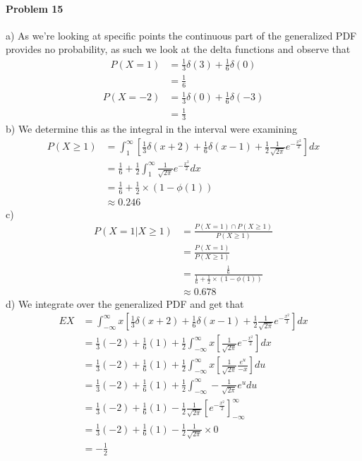 \paragraph{Problem 15}
a)
As we're looking at specific points the continuous part of the generalized PDF provides no probability, as such we look at the delta functions and observe that
\begin{align*}
    P(X=1)&=\frac{1}{3}\delta(3)+\frac{1}{6}\delta(0) \\
          &=\frac{1}{6}
\end{align*}
\begin{align*}
    P(X=-2)&=\frac{1}{3}\delta(0)+\frac{1}{6}\delta(-3) \\
           &=\frac{1}{3}
\end{align*}
b)
We determine this as the integral in the interval were examining
\begin{align*}
    P(X\geq 1)&=\int_{1}^{\infty}\left[\frac{1}{3}\delta(x+2)+\frac{1}{6}\delta(x-1)+\frac{1}{2}\frac{1}{\sqrt{2\pi}}e^{-\frac{x^{2}}{2}}\right]dx \\
              &=\frac{1}{6}+\frac{1}{2}\int_{1}^{\infty}\frac{1}{\sqrt{2\pi}}e^{-\frac{x^{2}}{2}}dx \\
              &=\frac{1}{6}+\frac{1}{2}\times\left(1-\phi(1)\right) \\
              &\approx 0.246
\end{align*}
c)
\begin{align*}
    P(X=1|X\geq 1)&=\frac{P(X=1)\cap P(X\geq 1)}{P(X\geq 1)} \\
               &=\frac{P(X=1)}{P(X\geq 1)} \\
               &=\frac{\frac{1}{6}}{\frac{1}{6}+\frac{1}{2}\times(1-\phi(1))} \\
               &\approx 0.678
\end{align*}
d)
We integrate over the generalized PDF and get that
\begin{align*}
    EX&=\int_{-\infty}^{\infty}x\left[\frac{1}{3}\delta(x+2)+\frac{1}{6}\delta(x-1)+\frac{1}{2}\frac{1}{\sqrt{2\pi}}e^{-\frac{x^{2}}{2}}\right]dx \\
      &=\frac{1}{3}(-2)+\frac{1}{6}(1)+\frac{1}{2}\int_{-\infty}^{\infty}x\left[\frac{1}{\sqrt{2\pi}}e^{-\frac{x^{2}}{2}}\right]dx \\
      &=\frac{1}{3}(-2)+\frac{1}{6}(1)+\frac{1}{2}\int_{-\infty}^{\infty}x\left[\frac{1}{\sqrt{2\pi}}\frac{e^{u}}{-x}\right]du \\
      &=\frac{1}{3}(-2)+\frac{1}{6}(1)+\frac{1}{2}\int_{-\infty}^{\infty}-\frac{1}{\sqrt{2\pi}}e^{u}du \\
      &=\frac{1}{3}(-2)+\frac{1}{6}(1)-\frac{1}{2}\frac{1}{\sqrt{2\pi}}\left[e^{-\frac{x^{2}}{2}}\right]_{-\infty}^{\infty} \\
      &=\frac{1}{3}(-2)+\frac{1}{6}(1)-\frac{1}{2}\frac{1}{\sqrt{2\pi}}\times 0 \\
      &=-\frac{1}{2}
\end{align*}
